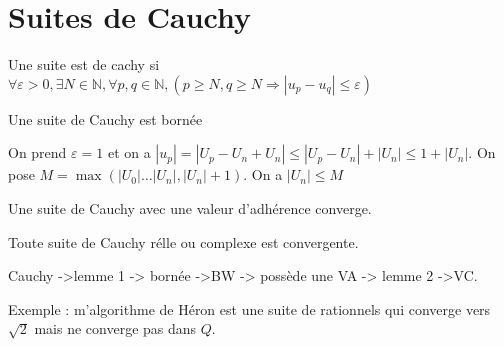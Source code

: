 \documentclass[french]{yLectureNote}
\begin{document}
\section{Suites de Cauchy}
\begin{definition}
Une suite est de cachy si \(\forall \varepsilon>0,\exists N\in\mathbb{N},\forall p,q \in\mathbb{N}, (p\geq N,q\geq N \Rightarrow |u_p-u_q|\leq \varepsilon)\)
\end{definition}
\begin{lemma}
Une suite de Cauchy est bornée
\end{lemma}
On prend $\varepsilon = 1$ et on a $|u_p|=|U_p-U_n+U_n|\leq |U_p-U_n|+|U_n|\leq 1 + |U_n|$. On pose $M = \max(|U_0|\dots |U_n|,|U_n|+1)$. On a $|U_n|\leq M$
\begin{lemma}
Une suite de Cauchy avec une valeur d'adhérence converge.
\end{lemma}
\begin{theorem}
 Toute suite de Cauchy rélle ou complexe est convergente.
\end{theorem}
Cauchy ->lemme 1 -> bornée ->BW -> possède une VA -> lemme 2 ->VC.

Exemple : m'algorithme de Héron est une suite de rationnels qui converge vers $\sqrt{2}$ mais ne converge pas dans $Q$.
\end{document}
